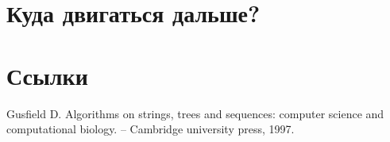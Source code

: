 \documentclass[letterpaper, 11pt]{article}
\begin{document}
\section{Куда двигаться дальше?}

\section{Ссылки}

\begingroup
\renewcommand{\section}[2]{}%
\begin{thebibliography}{7}
Gusfield D. Algorithms on strings, trees and sequences: computer science and computational biology. – Cambridge university press, 1997.


\end{thebibliography}
\endgroup
\end{document}
